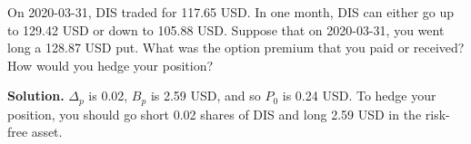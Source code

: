 \noindent On 2020-03-31, DIS traded for 117.65 USD. In one month, DIS can either go up to 129.42 USD or down to 105.88 USD. Suppose that on 2020-03-31, you went long a 128.87 USD put. What was the option premium that you paid or received? How would you hedge your position?

\vspace{9pt}

\noindent\textbf{Solution.} $\Delta_{p}$ is 0.02, $B_{p}$ is 2.59 USD, and so $P_{0}$ is 0.24 USD. To hedge your position, you should go short 0.02 shares of DIS and long 2.59 USD in the risk-free asset.
